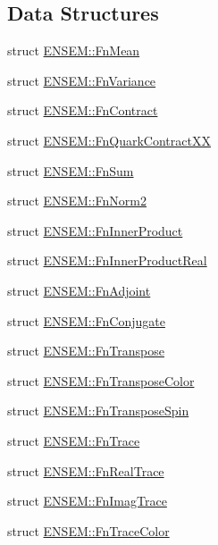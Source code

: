 \subsection*{Data Structures}
\begin{DoxyCompactItemize}
\item 
struct \mbox{\hyperlink{structENSEM_1_1FnMean}{E\+N\+S\+E\+M\+::\+Fn\+Mean}}
\item 
struct \mbox{\hyperlink{structENSEM_1_1FnVariance}{E\+N\+S\+E\+M\+::\+Fn\+Variance}}
\item 
struct \mbox{\hyperlink{structENSEM_1_1FnContract}{E\+N\+S\+E\+M\+::\+Fn\+Contract}}
\item 
struct \mbox{\hyperlink{structENSEM_1_1FnQuarkContractXX}{E\+N\+S\+E\+M\+::\+Fn\+Quark\+Contract\+XX}}
\item 
struct \mbox{\hyperlink{structENSEM_1_1FnSum}{E\+N\+S\+E\+M\+::\+Fn\+Sum}}
\item 
struct \mbox{\hyperlink{structENSEM_1_1FnNorm2}{E\+N\+S\+E\+M\+::\+Fn\+Norm2}}
\item 
struct \mbox{\hyperlink{structENSEM_1_1FnInnerProduct}{E\+N\+S\+E\+M\+::\+Fn\+Inner\+Product}}
\item 
struct \mbox{\hyperlink{structENSEM_1_1FnInnerProductReal}{E\+N\+S\+E\+M\+::\+Fn\+Inner\+Product\+Real}}
\item 
struct \mbox{\hyperlink{structENSEM_1_1FnAdjoint}{E\+N\+S\+E\+M\+::\+Fn\+Adjoint}}
\item 
struct \mbox{\hyperlink{structENSEM_1_1FnConjugate}{E\+N\+S\+E\+M\+::\+Fn\+Conjugate}}
\item 
struct \mbox{\hyperlink{structENSEM_1_1FnTranspose}{E\+N\+S\+E\+M\+::\+Fn\+Transpose}}
\item 
struct \mbox{\hyperlink{structENSEM_1_1FnTransposeColor}{E\+N\+S\+E\+M\+::\+Fn\+Transpose\+Color}}
\item 
struct \mbox{\hyperlink{structENSEM_1_1FnTransposeSpin}{E\+N\+S\+E\+M\+::\+Fn\+Transpose\+Spin}}
\item 
struct \mbox{\hyperlink{structENSEM_1_1FnTrace}{E\+N\+S\+E\+M\+::\+Fn\+Trace}}
\item 
struct \mbox{\hyperlink{structENSEM_1_1FnRealTrace}{E\+N\+S\+E\+M\+::\+Fn\+Real\+Trace}}
\item 
struct \mbox{\hyperlink{structENSEM_1_1FnImagTrace}{E\+N\+S\+E\+M\+::\+Fn\+Imag\+Trace}}
\item 
struct \mbox{\hyperlink{structENSEM_1_1FnTraceColor}{E\+N\+S\+E\+M\+::\+Fn\+Trace\+Color}}
\item 

\end{DoxyCompactItemize}

